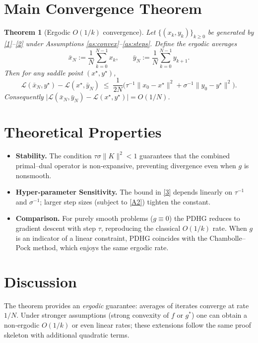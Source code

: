 \documentclass{article}
\newtheorem{theorem}{Theorem}
\begin{document}
\section*{Main Convergence Theorem}
\begin{theorem}[Ergodic $O(1/k)$ convergence]\label{thm:conv}
Let $\{(x_{k},y_{k})\}_{k\ge0}$ be generated by \eqref{1}–\eqref{2} under Assumptions \ref{as:convex}–\ref{as:steps}.
Define the ergodic averages
\[
\bar x_{N}:=\frac{1}{N}\sum_{k=0}^{N-1}x_{k},\qquad 
\bar y_{N}:=\frac{1}{N}\sum_{k=0}^{N-1}y_{k+1}.
\]
Then for any saddle point $(x^{\star},y^{\star})$,
\[
\mathcal{L}(\bar x_{N},y^{\star})-\mathcal{L}(x^{\star},\bar y_{N})
\;\le\;
\frac{1}{2N}\bigl(
\tau^{-1}\|x_{0}-x^{\star}\|^{2}
+\sigma^{-1}\|y_{0}-y^{\star}\|^{2}
\bigr).
\tag{3}
\]
Consequently $\bigl|\mathcal{L}(\bar x_{N},\bar y_{N})- \mathcal{L}(x^{\star},y^{\star})\bigr|=O(1/N)$.
\end{theorem}

\section*{Theoretical Properties}
\begin{itemize}
\item \textbf{Stability.} The condition $\tau\sigma\|K\|^{2}<1$ guarantees that the combined primal–dual operator is non‑expansive, preventing divergence even when $g$ is nonsmooth.
\item \textbf{Hyper‑parameter Sensitivity.} The bound in \eqref{3} depends linearly on $\tau^{-1}$ and $\sigma^{-1}$; larger step sizes (subject to \eqref{A2}) tighten the constant.
\item \textbf{Comparison.} For purely smooth problems ($g\equiv0$) the PDHG reduces to gradient descent with step $\tau$, reproducing the classical $O(1/k)$ rate. When $g$ is an indicator of a linear constraint, PDHG coincides with the Chambolle–Pock method, which enjoys the same ergodic rate.
\end{itemize}

\section*{Discussion}
The theorem provides an \emph{ergodic} guarantee: averages of iterates converge at rate $1/N$. Under stronger assumptions (strong convexity of $f$ or $g^{*}$) one can obtain a non‑ergodic $O(1/k)$ or even linear rates; these extensions follow the same proof skeleton with additional quadratic terms.
\end{document}
